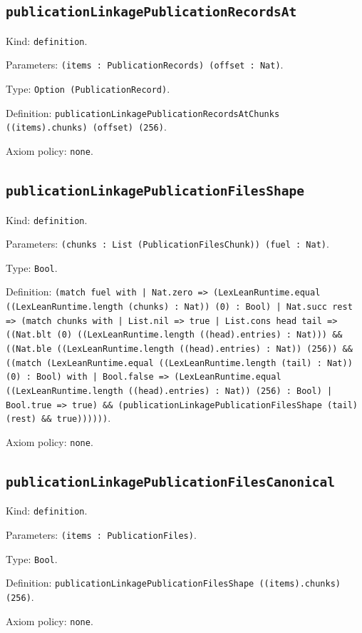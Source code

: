 \documentclass[11pt]{article}
\begin{document}
\subsection*{\texttt{publicationLinkagePublicationRecordsAt}}
\noindent Kind: \texttt{definition}.\par
\noindent Parameters: \texttt{(items : PublicationRecords) (offset : Nat)}.\par
\noindent Type: \texttt{Option (PublicationRecord)}.\par
\noindent Definition: \texttt{publicationLinkagePublicationRecordsAtChunks ((items).chunks) (offset) (256)}.\par
\noindent Axiom policy: \texttt{none}.\par
\subsection*{\texttt{publicationLinkagePublicationFilesShape}}
\noindent Kind: \texttt{definition}.\par
\noindent Parameters: \texttt{(chunks : List (PublicationFilesChunk)) (fuel : Nat)}.\par
\noindent Type: \texttt{Bool}.\par
\noindent Definition: \texttt{(match fuel with | Nat.zero => (LexLeanRuntime.equal ((LexLeanRuntime.length (chunks) : Nat)) (0) : Bool) | Nat.succ rest => (match chunks with | List.nil => true | List.cons head tail => ((Nat.blt (0) ((LexLeanRuntime.length ((head).entries) : Nat))) \&\& ((Nat.ble ((LexLeanRuntime.length ((head).entries) : Nat)) (256)) \&\& ((match (LexLeanRuntime.equal ((LexLeanRuntime.length (tail) : Nat)) (0) : Bool) with | Bool.false => (LexLeanRuntime.equal ((LexLeanRuntime.length ((head).entries) : Nat)) (256) : Bool) | Bool.true => true) \&\& (publicationLinkagePublicationFilesShape (tail) (rest) \&\& true))))))}.\par
\noindent Axiom policy: \texttt{none}.\par
\subsection*{\texttt{publicationLinkagePublicationFilesCanonical}}
\noindent Kind: \texttt{definition}.\par
\noindent Parameters: \texttt{(items : PublicationFiles)}.\par
\noindent Type: \texttt{Bool}.\par
\noindent Definition: \texttt{publicationLinkagePublicationFilesShape ((items).chunks) (256)}.\par
\noindent Axiom policy: \texttt{none}.\par
\end{document}
